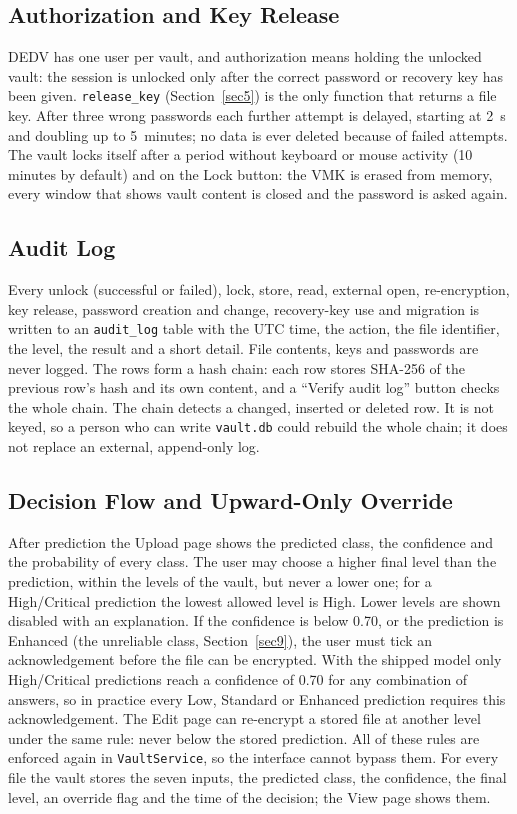 \documentclass[pdflatex,sn-mathphys-num]{sn-jnl}
\newcommand{\code}[1]{\texttt{#1}}
\begin{document}
\subsection{Authorization and Key Release}

DEDV has one user per vault, and authorization means holding the unlocked vault: the session is
unlocked only after the correct password or recovery key has been given. \code{release\_key}
(Section~\ref{sec5}) is the only function that returns a file key. After three wrong passwords
each further attempt is delayed, starting at 2~s and doubling up to 5~minutes; no data is ever
deleted because of failed attempts. The vault locks itself after a period without keyboard or
mouse activity (10 minutes by default) and on the Lock button: the VMK is erased from memory, every
window that shows vault content is closed and the password is asked again.

\subsection{Audit Log}

Every unlock (successful or failed), lock, store, read, external open, re-encryption, key release,
password creation and change, recovery-key use and migration is written to an \code{audit\_log} table with the
UTC time, the action, the file identifier, the level, the result and a short detail. File
contents, keys and passwords are never logged. The rows form a hash chain: each row stores
SHA-256 of the previous row's hash and its own content, and a ``Verify audit log'' button checks
the whole chain. The chain detects a changed, inserted or deleted row. It is not keyed, so a person
who can write \code{vault.db} could rebuild the whole chain; it does not replace an external,
append-only log.

\subsection{Decision Flow and Upward-Only Override}

After prediction the Upload page shows the predicted class, the confidence and the probability of
every class. The user may choose a higher final level than the prediction, within the levels of
the vault, but never a lower one; for a High/Critical prediction the lowest allowed level is High.
Lower levels are shown disabled with an explanation. If the confidence is below 0.70, or the
prediction is Enhanced (the unreliable class, Section~\ref{sec9}), the user must tick an
acknowledgement before the file can be encrypted. With the shipped model only High/Critical
predictions reach a confidence of 0.70 for any combination of answers, so in practice every Low,
Standard or Enhanced prediction requires this acknowledgement. The Edit page can re-encrypt a
stored file at another level under the same rule: never below the stored prediction. All of these
rules are enforced again in \code{VaultService}, so the interface cannot bypass them. For every
file the vault stores the seven inputs, the predicted class, the confidence, the final level, an
override flag and the time of the decision; the View page shows them.
\end{document}
